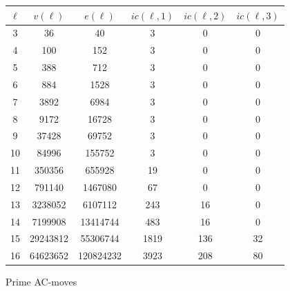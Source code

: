 \begin{figure}
	\begin{tabular}{|c|c|c|c|c|c|}
		\hline
		$\ell$ & $v(\ell)$ & $e(\ell)$ & $ic(\ell,1)$ & $ic(\ell,2)$ & $ic(\ell,3)$ \\ \hline
		3 & 36 & 40 & 3 & 0 & 0 \\ \hline
		4 & 100 & 152 & 3 & 0 & 0 \\ \hline
		5 & 388 & 712 & 3 & 0 & 0 \\ \hline
		6 & 884 & 1528 & 3 & 0 & 0 \\ \hline
		7 & 3892 & 6984 & 3 & 0 & 0 \\ \hline
		8 & 9172 & 16728 & 3 & 0 & 0 \\ \hline
		9 & 37428 & 69752 & 3 & 0 & 0 \\ \hline
		10 & 84996 & 155752 & 3 & 0 & 0 \\ \hline
		11 & 350356 & 655928 & 19 & 0 & 0 \\ \hline
		12 & 791140 & 1467080 & 67 & 0 & 0 \\ \hline
		13 & 3238052 & 6107112 & 243 & 16 & 0 \\ \hline
		14 & 7199908 & 13414744 & 483 & 16 & 0 \\ \hline
		15 & 29243812 & 55306744 & 1819 & 136 & 32 \\ \hline
		16 & 64623652 & 120824232 & 3923 & 208 & 80 \\ \hline
	\end{tabular}
	\caption{Prime AC-moves}
	\label{fig:prime_persistence}
\end{figure}


